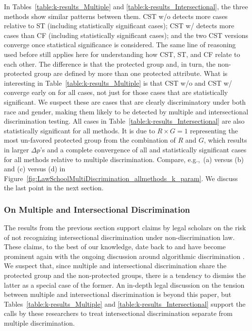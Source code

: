 In Tables~\ref{table:k-results_Multiple} and \ref{table:k-results_Intersectional}, the three methods show similar patterns between them.
CST w/o detects more cases relative to ST (including statistically significant cases); CST w/ detects more cases than CF (including statistically significant cases); and the two CST versions converge once statistical significance is considered.
The same line of reasoning used before still applies here for understanding how CST, ST, and CF relate to each other.
The difference is that the protected group and, in turn, the non-protected group are defined by more than one protected attribute.
What is interesting in Table~\ref{table:k-results_Multiple} is that CST w/o and CST w/ converge early on for all cases, not just for those cases that are statistically significant.
We suspect these are cases that are clearly discriminatory under both race and gender, making them likely to be detected by multiple and intersectional discrimination testing.
All cases in Table~\ref{table:k-results_Intersectional} are also statistically significant for all methods.
It is due to $R \times G=1$ representing the most un-favored protected group from the combination of $R$ and $G$, which results in larger $\Delta p$'s and a complete convergence of all and statistically significant cases for all methods relative to multiple discrimination. 
Compare, e.g.,~(a) versus (b) and (c) versus (d) in Figure~\ref{fig:LawSchoolMultiDiscrimination_allmethods_k_param}. 
We discuss the last point in the next section.  

\subsubsection{On Multiple and Intersectional Discrimination}
\label{sec:Experiments.Real.Multiple_vs_Intersectional}

The results from the previous section support claims by legal scholars on the risk of not recognizing intersectional discrimination under non-discrimination law.
These claims, to the best of our knowledge, date back to \textcite{Crenshaw1989_DemarginalizingTheIntersection} and have become prominent again with the ongoing discussion around algorithmic discrimination \parencite{Xenidis2020_TunningEULaw}.
We suspect that, since multiple and intersectional discrimination share the protected group and the non-protected groups, there is a tendency to dismiss the latter as a special case of the former.
An in-depth legal discussion on the tension between multiple and intersectional discrimination is beyond this paper, but Tables~\ref{table:k-results_Multiple} and \ref{table:k-results_Intersectional} support the calls by these researchers to treat intersectional discrimination separate from multiple discrimination.

